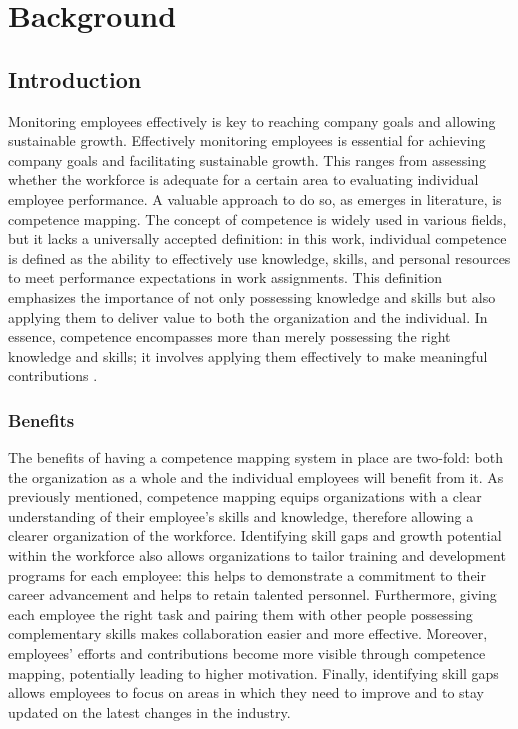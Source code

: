 \chapter{Background}

\section{Introduction}

Monitoring employees effectively is key to reaching company goals and allowing sustainable growth. Effectively monitoring employees is essential for achieving company goals and facilitating sustainable growth. This ranges from assessing whether the workforce is adequate for a certain area to evaluating individual employee performance. A valuable approach to do so, as emerges in literature, is competence mapping. The concept of competence is widely used in various fields, but it lacks a universally accepted definition: in this work, individual competence is defined as the ability to effectively use knowledge, skills, and personal resources to meet performance expectations in work assignments. This definition emphasizes the importance of not only possessing knowledge and skills but also applying them to deliver value to both the organization and the individual. In essence, competence encompasses more than merely possessing the right knowledge and skills; it involves applying them effectively to make meaningful contributions \cite{takey2015}.

\subsection{Benefits}

The benefits of having a competence mapping system in place are two-fold: both the organization as a whole and the individual employees will benefit from it. As previously mentioned, competence mapping equips organizations with a clear understanding of their employee's skills and knowledge, therefore allowing a clearer organization of the workforce. Identifying skill gaps and growth potential within the workforce also allows organizations to tailor training and development programs for each employee: this helps to demonstrate a commitment to their career advancement and helps to retain talented personnel. Furthermore, giving each employee the right task and pairing them with other people possessing complementary skills makes collaboration easier and more effective. Moreover, employees' efforts and contributions become more visible through competence mapping, potentially leading to higher motivation. Finally, identifying skill gaps allows employees to focus on areas in which they need to improve and to stay updated on the latest changes in the industry.\\

